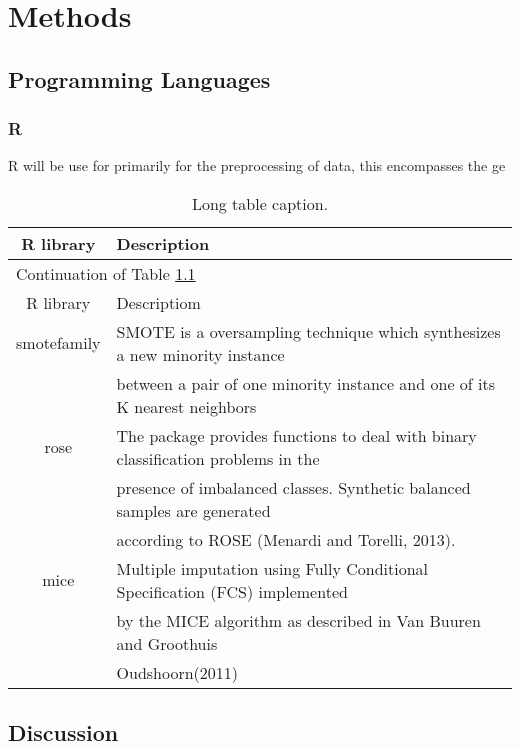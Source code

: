 \chapter{Methods}\label{ch:eval}


\section{Programming Languages}

\subsection{R}
R will be use for primarily for the preprocessing of data, this encompasses the ge



 \begin{longtable}[c]{| c | l |}
 \caption{Long table caption.\label{long}}\\

 
 \hline
 R library & Description\\
 \hline
 \endfirsthead

 \hline
 \multicolumn{2}{|l|}{Continuation of Table \ref{long}}\\
 \hline
 R library & Descriptiom\\
 \hline
 \endhead

 \hline
 \endlastfoot

smotefamily & SMOTE is a oversampling technique which synthesizes a new minority instance  \\
& between a pair of one minority instance and one of its K nearest neighbors\\
 \hline
rose & The package provides functions to deal with binary classification problems in the \\
& presence of imbalanced classes. Synthetic balanced samples are generated \\ 
& according to ROSE (Menardi and Torelli, 2013).\\
 \hline
 mice & Multiple imputation using Fully Conditional Specification (FCS) implemented \\
 & by the MICE algorithm as described in Van Buuren and Groothuis \\ 
 & Oudshoorn(2011)
 \end{longtable}


\section{Discussion}

